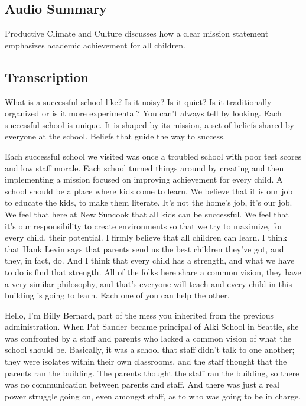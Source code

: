 \subsection{Audio Summary}

Productive Climate and Culture discusses how a clear mission statement emphasizes academic achievement for all children.

\subsection{Transcription}

What is a successful school like?
Is it noisy?
Is it quiet?
Is it traditionally organized or is it more experimental?
You can't always tell by looking.
Each successful school is unique.
It is shaped by its mission, a set of beliefs shared by everyone at the school.
Beliefs that guide the way to success.

Each successful school we visited was once a troubled school with poor test scores and low staff morale.
Each school turned things around by creating and then implementing a mission focused on improving achievement for every child.
A school should be a place where kids come to learn.
We believe that it is our job to educate the kids, to make them literate.
It's not the home's job, it's our job.
We feel that here at New Suncook that all kids can be successful.
We feel that it's our responsibility to create environments so that we try to maximize, for every child, their potential.
I firmly believe that all children can learn.
I think that Hank Levin says that parents send us the best children they've got, and they, in fact, do.
And I think that every child has a strength, and what we have to do is find that strength.
All of the folks here share a common vision, they have a very similar philosophy, and that's everyone will teach and every child in this building is going to learn.
Each one of you can help the other.

Hello, I'm Billy Bernard, part of the mess you inherited from the previous administration.
When Pat Sander became principal of Alki School in Seattle, she was confronted by a staff and parents who lacked a common vision of what the school should be.
Basically, it was a school that staff didn't talk to one another; they were isolates within their own classrooms, and the staff thought that the parents ran the building.
The parents thought the staff ran the building, so there was no communication between parents and staff.
And there was just a real power struggle going on, even amongst staff, as to who was going to be in charge.

